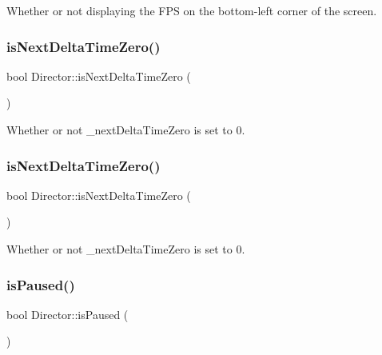 Whether or not displaying the F\+PS on the bottom-\/left corner of the screen. \mbox{\label{classDirector_a5f2f66a2f14f63e2a5fabb601c972b8b}} 
\subsubsection{\texorpdfstring{is\+Next\+Delta\+Time\+Zero()}{isNextDeltaTimeZero()}\hspace{0.1cm}{\footnotesize\ttfamily [1/2]}}
{\footnotesize\ttfamily bool Director\+::is\+Next\+Delta\+Time\+Zero (\begin{DoxyParamCaption}{ }\end{DoxyParamCaption})\hspace{0.3cm}{\ttfamily [inline]}}

Whether or not {\ttfamily \+\_\+next\+Delta\+Time\+Zero} is set to 0. \mbox{\label{classDirector_a5f2f66a2f14f63e2a5fabb601c972b8b}} 
\subsubsection{\texorpdfstring{is\+Next\+Delta\+Time\+Zero()}{isNextDeltaTimeZero()}\hspace{0.1cm}{\footnotesize\ttfamily [2/2]}}
{\footnotesize\ttfamily bool Director\+::is\+Next\+Delta\+Time\+Zero (\begin{DoxyParamCaption}{ }\end{DoxyParamCaption})\hspace{0.3cm}{\ttfamily [inline]}}

Whether or not {\ttfamily \+\_\+next\+Delta\+Time\+Zero} is set to 0. \mbox{\label{classDirector_a18b86013970deb49290996518f0ddae5}} 
\subsubsection{\texorpdfstring{is\+Paused()}{isPaused()}\hspace{0.1cm}{\footnotesize\ttfamily [1/2]}}
{\footnotesize\ttfamily bool Director\+::is\+Paused (\begin{DoxyParamCaption}{ }\end{DoxyParamCaption})\hspace{0.3cm}{\ttfamily [inline]}}

